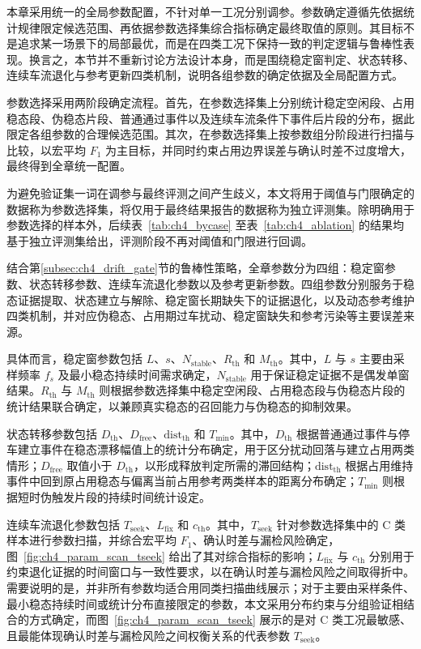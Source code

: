\documentclass{xdupgthesis}
\begin{document}
本章采用统一的全局参数配置，不针对单一工况分别调参。参数确定遵循先依据统计规律限定候选范围、再依据参数选择集综合指标确定最终取值的原则。其目标不是追求某一场景下的局部最优，而是在四类工况下保持一致的判定逻辑与鲁棒性表现。换言之，本节并不重新讨论方法设计本身，而是围绕稳定窗判定、状态转移、连续车流退化与参考更新四类机制，说明各组参数的确定依据及全局配置方式。

参数选择采用两阶段确定流程。首先，在参数选择集上分别统计稳定空闲段、占用稳态段、伪稳态片段、普通通过事件以及连续车流条件下事件后片段的分布，据此限定各组参数的合理候选范围。其次，在参数选择集上按参数组分阶段进行扫描与比较，以宏平均 $F_1$ 为主目标，并同时约束占用边界误差与确认时差不过度增大，最终得到全章统一配置。

为避免验证集一词在调参与最终评测之间产生歧义，本文将用于阈值与门限确定的数据称为参数选择集，将仅用于最终结果报告的数据称为独立评测集。除明确用于参数选择的样本外，后续表~\ref{tab:ch4_bycase} 至表~\ref{tab:ch4_ablation} 的结果均基于独立评测集给出，评测阶段不再对阈值和门限进行回调。

结合第\ref{subsec:ch4_drift_gate}节的鲁棒性策略，全章参数分为四组：稳定窗参数、状态转移参数、连续车流退化参数以及参考更新参数。四组参数分别服务于稳态证据提取、状态建立与解除、稳定窗长期缺失下的证据退化，以及动态参考维护四类机制，并对应伪稳态、占用期过车扰动、稳定窗缺失和参考污染等主要误差来源。

具体而言，稳定窗参数包括 $L$、$s$、$N_{\mathrm{stable}}$、$R_{\mathrm{th}}$ 和 $M_{\mathrm{th}}$。其中，$L$ 与 $s$ 主要由采样频率 $f_s$ 及最小稳态持续时间需求确定，$N_{\mathrm{stable}}$ 用于保证稳定证据不是偶发单窗结果。$R_{\mathrm{th}}$ 与 $M_{\mathrm{th}}$ 则根据参数选择集中稳定空闲段、占用稳态段与伪稳态片段的统计结果联合确定，以兼顾真实稳态的召回能力与伪稳态的抑制效果。

状态转移参数包括 $D_{\mathrm{th}}$、$D_{\mathrm{free}}$、$\mathrm{dist}_{\mathrm{th}}$ 和 $T_{\min}$。其中，$D_{\mathrm{th}}$ 根据普通通过事件与停车建立事件在稳态漂移幅值上的统计分布确定，用于区分扰动回落与建立占用两类情形；$D_{\mathrm{free}}$ 取值小于 $D_{\mathrm{th}}$，以形成释放判定所需的滞回结构；$\mathrm{dist}_{\mathrm{th}}$ 根据占用维持事件中回到原占用稳态与偏离当前占用参考两类样本的距离分布确定；$T_{\min}$ 则根据短时伪触发片段的持续时间统计设定。

连续车流退化参数包括 $T_{\mathrm{seek}}$、$L_{\mathrm{fix}}$ 和 $c_{\mathrm{th}}$。其中，$T_{\mathrm{seek}}$ 针对参数选择集中的 C 类样本进行参数扫描，并综合宏平均 $F_1$、确认时差与漏检风险确定，图~\ref{fig:ch4_param_scan_tseek} 给出了其对综合指标的影响；$L_{\mathrm{fix}}$ 与 $c_{\mathrm{th}}$ 分别用于约束退化证据的时间窗口与一致性要求，以在确认时差与漏检风险之间取得折中。需要说明的是，并非所有参数均适合用同类扫描曲线展示；对于主要由采样条件、最小稳态持续时间或统计分布直接限定的参数，本文采用分布约束与分组验证相结合的方式确定，而图~\ref{fig:ch4_param_scan_tseek} 展示的是对 C 类工况最敏感、且最能体现确认时差与漏检风险之间权衡关系的代表参数 $T_{\mathrm{seek}}$。
\end{document}
